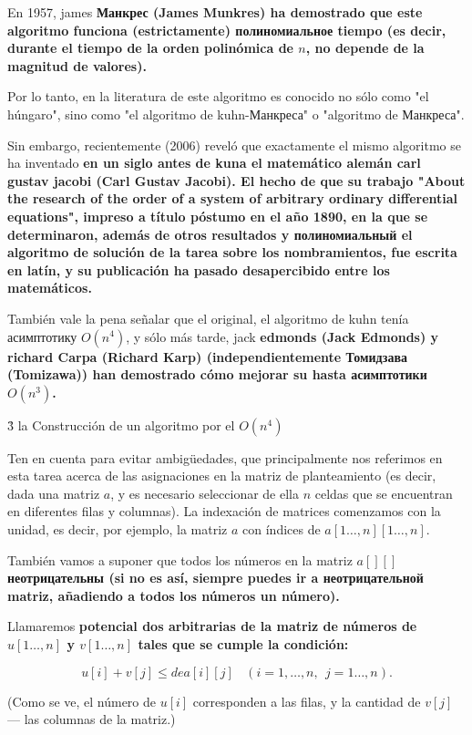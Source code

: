 En 1957, james \bf{Манкрес} (James Munkres) ha demostrado que este algoritmo funciona (estrictamente) полиномиальное tiempo (es decir, durante el tiempo de la orden polinómica de $n$, no depende de la magnitud de valores).

Por lo tanto, en la literatura de este algoritmo es conocido no sólo como "el húngaro", sino como "el algoritmo de kuhn-Манкреса" o "algoritmo de Манкреса".

Sin embargo, recientemente (2006) reveló que exactamente el mismo algoritmo se ha inventado \bf{en un siglo antes de kuna} el matemático alemán carl gustav \bf{jacobi} (Carl Gustav Jacobi). El hecho de que su trabajo "About the research of the order of a system of arbitrary ordinary differential equations", impreso a título póstumo en el año 1890, en la que se determinaron, además de otros resultados y полиномиальный el algoritmo de solución de la tarea sobre los nombramientos, fue escrita en latín, y su publicación \bf{ha pasado desapercibido} entre los matemáticos.

También vale la pena señalar que el original, el algoritmo de kuhn tenía асимптотику $O(n^4)$, y sólo más tarde, jack \bf{edmonds} (Jack Edmonds) y richard \bf{Carpa} (Richard Karp) (independientemente \bf{Томидзава} (Tomizawa)) han demostrado cómo mejorar su hasta асимптотики $O(n^3)$.


\h3{ la Construcción de un algoritmo por el $O(n^4)$ }

Ten en cuenta para evitar ambigüedades, que principalmente nos referimos en esta tarea acerca de las asignaciones en la matriz de planteamiento (es decir, dada una matriz $a$, y es necesario seleccionar de ella $n$ celdas que se encuentran en diferentes filas y columnas). La indexación de matrices comenzamos con la unidad, es decir, por ejemplo, la matriz $a$ con índices de $a[1 \ldots, n][1 \ldots, n]$.

También vamos a suponer que todos los números en la matriz $a[][]$ \bf{неотрицательны} (si no es así, siempre puedes ir a неотрицательной matriz, añadiendo a todos los números un número).

Llamaremos \bf{potencial} dos arbitrarias de la matriz de números de $u[1 \ldots, n]$ y $v[1 \ldots, n]$ tales que se cumple la condición:

$$ u[i] + v[j] \le de a[i][j] ~~~~ (i = 1, \ldots, n, ~~ j = 1 \ldots, n). $$

(Como se ve, el número de $u[i]$ corresponden a las filas, y la cantidad de $v[j]$ --- las columnas de la matriz.)

